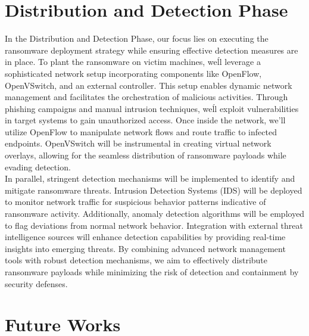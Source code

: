 \documentclass[12pt,twocolumn]{article}
\begin{document}
\section{Distribution and Detection Phase}

In the Distribution and Detection Phase, our focus lies on executing the ransomware deployment strategy while ensuring effective detection measures are in place. To plant the ransomware on victim machines, we\'ll leverage a sophisticated network setup incorporating components like OpenFlow, OpenVSwitch, and an external controller. This setup enables dynamic network management and facilitates the orchestration of malicious activities. Through phishing campaigns and manual intrusion techniques, we\'ll exploit vulnerabilities in target systems to gain unauthorized access. Once inside the network, we'll utilize OpenFlow to manipulate network flows and route traffic to infected endpoints. OpenVSwitch will be instrumental in creating virtual network overlays, allowing for the seamless distribution of ransomware payloads while evading detection.
\\
In parallel, stringent detection mechanisms will be implemented to identify and mitigate ransomware threats. Intrusion Detection Systems (IDS) will be deployed to monitor network traffic for suspicious behavior patterns indicative of ransomware activity. Additionally, anomaly detection algorithms will be employed to flag deviations from normal network behavior. Integration with external threat intelligence sources will enhance detection capabilities by providing real-time insights into emerging threats. By combining advanced network management tools with robust detection mechanisms, we aim to effectively distribute ransomware payloads while minimizing the risk of detection and containment by security defenses.


\section{Future Works}
\end{document}
